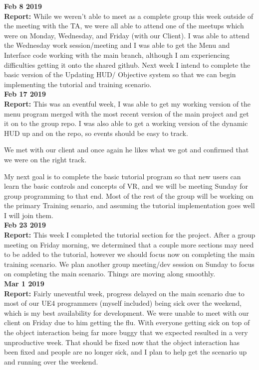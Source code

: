 \textbf{Feb 8 2019}\\
\textbf{Report:}
While we weren't able to meet as a complete group this week outside of the meeting with the TA, we were all able to attend one of the meetups which were on Monday, Wednesday, and Friday (with our Client). I was able to attend the Wednesday work session/meeting and I was able to get the Menu and Interface code working with the main branch, although I am experiencing difficulties getting it onto the shared github. Next week I intend to complete the basic version of the Updating HUD/ Objective system so that we can begin implementing the tutorial and training scenario. \\

\textbf{Feb 17 2019}\\

\textbf{Report:}
This was an eventful week, I was able to get my working version of the menu program merged with the most recent version of the main project and get it on to the group repo. I was also able to get a working version of the dynamic HUD up and on the repo, so events should be easy to track.


We met with our client and once again he likes what we got and confirmed that we were on the right track.

My next goal is to complete the basic tutorial program so that new users can learn the basic controls and concepts of VR, and we will be meeting Sunday for group programming to that end. Most of the rest of the group will be working on the primary Training senario, and assuming the tutorial implementation goes well I will join them.\\

\textbf{Feb 23 2019}\\
\textbf{Report:}
This week I completed the tutorial section for the project. After a group meeting on Friday morning, we determined that a couple more sections may need to be added to the tutorial, however we should focus now on completing the main training scenario. We plan another group meeting/dev session on Sunday to focus on completing the main scenario. Things are moving along smoothly.\\

\textbf{Mar 1 2019}\\
\textbf{Report:} 
Fairly uneventful week, progress delayed on the main scenario due to most of our UE4 programmers (myself included) being sick over the weekend, which is my best availability for development. We were unable to meet with our client on Friday due to him  getting the flu. With everyone getting sick on top of the object interaction being far more buggy that we expected resulted in a very unproductive week. That should be fixed now that the object interaction has been fixed and people are no longer sick, and I plan to help get the scenario up and running over the weekend.  \\

